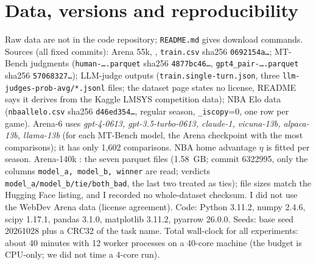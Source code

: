 \documentclass{article}
\theoremstyle{plain}
\theoremstyle{remark}
\begin{document}
\section{Data, versions and reproducibility}\label{app:data}
Raw data are not in the code repository; \texttt{README.md} gives download commands. Sources (all fixed commits): Arena 55k, \citet{lmarena55k}, \texttt{train.csv} sha256 \texttt{0692154a\ldots}; MT-Bench judgments \citep{mtbenchhf} (\texttt{human-\ldots.parquet} sha256 \texttt{4877bc46\ldots}, \texttt{gpt4\_pair-\ldots.parquet} sha256 \texttt{57068327\ldots}); LLM-judge outputs \citep{potsawee2024} (\texttt{train.single-turn.json}, three \texttt{llm-judges-prob-avg/*.jsonl} files; the dataset page states no license, README says it derives from the Kaggle LMSYS competition data); NBA Elo data \citep{nbaelo} (\texttt{nbaallelo.csv} sha256 \texttt{d46ed354\ldots}, regular season, \texttt{\_iscopy}=0, one row per game). Arena-6 uses \emph{gpt-4-0613, gpt-3.5-turbo-0613, claude-1, vicuna-13b, alpaca-13b, llama-13b} (for each MT-Bench model, the Arena checkpoint with the most comparisons); it has only 1,602 comparisons. NBA home advantage $\eta$ is fitted per season. Arena-140k \citep{lmarena140k}: the seven parquet files (1.58~GB; commit 6322995, only the columns \texttt{model\_a, model\_b, winner} are read; verdicts \texttt{model\_a/model\_b/tie/both\_bad}, the last two treated as ties); file sizes match the Hugging Face listing, and I recorded no whole-dataset checksum. I did not use the WebDev Arena data (license agreement). Code: Python 3.11.2, numpy 2.4.6, scipy 1.17.1, pandas 3.1.0, matplotlib 3.11.2, pyarrow 26.0.0. Seeds: base seed 20261028 plus a CRC32 of the task name. Total wall-clock for all experiments: about 40 minutes with 12 worker processes on a 40-core machine (the budget is CPU-only; we did not time a 4-core run).
\end{document}
